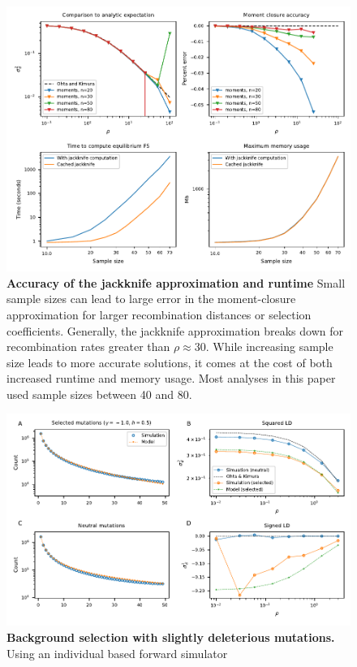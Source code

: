 \documentclass[]{article}
\begin{document}
\begin{figure}[ht!]
    \centering
    \includegraphics{../figures/jackknife}
    \caption{
        \textbf{Accuracy of the jackknife approximation and runtime} Small
        sample sizes can lead to large error in the moment-closure
        approximation for larger recombination distances or selection
        coefficients. Generally, the jackknife approximation breaks down for
        recombination rates greater than \(\rho\approx30\). While increasing
        sample size leads to more accurate solutions, it comes at the cost of
        both increased runtime and memory usage. Most analyses in this paper
        used sample sizes between 40 and 80.
    }
    \label{fig:jackknife}
\end{figure}

\begin{figure}[ht!]
    \centering
    \includegraphics{../figures/bgs_gamma_-1.0_h_0.5_n_50}
    \caption{
        \textbf{Background selection with slightly deleterious mutations.}
        Using an individual based forward simulator
    }
    \label{fig:bgs1}
\end{figure}
\end{document}
